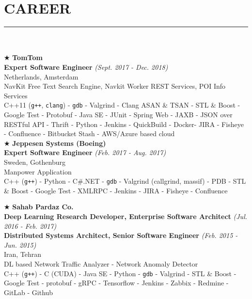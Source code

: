 \documentclass[10pt,a4paper]{article}
\begin{document}
\section{CAREER}
\noindent\rule {18.0cm}{0.2pt} \\ \\
$\bigstar$ \hspace{0.1cm} \large \textbf{TomTom} \\
\indent \small \textbf{Expert Software Engineer} \textsl{(Sept. 2017 - Dec. 2018)} \\
\indent \textnormal{Netherlands, Amsterdam} \\
\indent \textbullet \hspace{0.05cm} NavKit Free Text Search Engine, Navkit Worker REST Services, POI Info Services \\
\indent \textbullet \hspace{0.05cm} C++11 (\texttt{g++}, \texttt{clang}) - \texttt{gdb} - Valgrind - Clang ASAN \& TSAN - STL \& Boost - Google Test - Protobuf - Java SE - JUnit - Spring Web - JAXB - JSON over RESTful API - Thrift - Python - Jenkins - QuickBuild - Docker- JIRA - Fisheye - Confluence - Bitbucket Stash - AWS/Azure based cloud \\

\noindent $\bigstar$ \hspace{0.1cm} \large \textbf{Jeppesen Systems (Boeing)} \\
\indent \small \textbf{Expert Software Engineer} \textsl{(Feb. 2017 - Aug. 2017)} \\
\indent \textnormal{Sweden, Gothenburg} \\
\indent \textbullet \hspace{0.05cm} Manpower Application \\
\indent \textbullet \hspace{0.05cm} C++ (\texttt{g++}) - Python - C\#.NET - \texttt{gdb} - Valgrind (callgrind, massif) - PDB - STL \& Boost - Google Test - XMLRPC - Jenkins - JIRA - Fisheye - Confluence

\break

\noindent $\bigstar$ \hspace{0.1cm} \large \textbf{Sahab Pardaz Co.} \\
\indent \small \textbf{Deep Learning Research Developer, Enterprise Software Architect} \textsl{(Jul. 2016 - Feb. 2017)} \\
\indent \small \textbf{Distributed Systems Architect, Senior Software Engineer} \textsl{(Feb. 2015 - Jun. 2015)} \\
\indent \textnormal{Iran, Tehran} \\
\indent \textbullet \hspace{0.05cm} DL based Network Traffic Analyzer - Network Anomaly Detector \\
\indent \textbullet \hspace{0.05cm} C++ (\texttt{g++}) - C (CUDA) - Java SE - Python - \texttt{gdb} - Valgrind - STL \& Boost - Google Test - protobuf - gRPC - Tensorflow - Jenkins - Zabbix - Redmine - GitLab - Github \\
\end{document}
